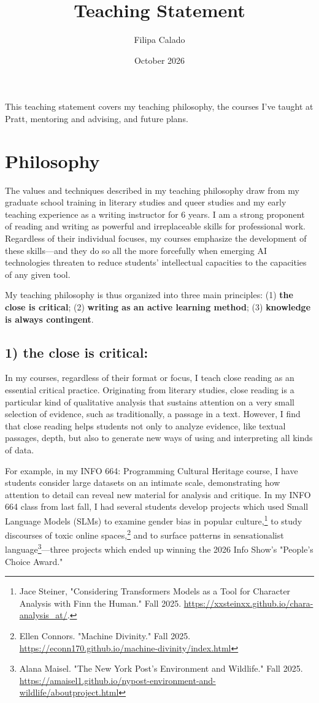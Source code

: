 \documentclass[12pt]{article}
\author{Filipa Calado}
\date{October 2026}
\title{Teaching Statement}
\makeatletter
\renewcommand{\maketitle}{%
\begin{center}
{\LARGE\@title\par}
\vspace{0.5em}
{\large\@author\par}
\vspace{0.5em}
{\large\@date\par}
\end{center}
}
\makeatother
\begin{document}
\maketitle
This teaching statement covers my teaching philosophy, the courses
I've taught at Pratt, mentoring and advising, and future plans.

\section*{Philosophy}
\label{sec:org847a04e}
The values and techniques described in my teaching philosophy draw
from my graduate school training in literary studies and queer studies
and my early teaching experience as a writing instructor for 6 years.
I am a strong proponent of reading and writing as powerful and
irreplaceable skills for professional work. Regardless of their
individual focuses, my courses emphasize the development of these
skills---and they do so all the more forcefully when emerging AI
technologies threaten to reduce students' intellectual capacities to
the capacities of any given tool.

My teaching philosophy is thus organized into three main principles:
(1) \textbf{the close is critical}; (2) \textbf{writing as an active learning
method}; (3) \textbf{knowledge is always contingent}.

\subsection*{1) the close is critical:}
\label{sec:org32f7663}
In my courses, regardless of their format or focus, I teach close
reading as an essential critical practice. Originating from literary
studies, close reading is a particular kind of qualitative analysis
that sustains attention on a very small selection of evidence, such as
traditionally, a passage in a text. However, I find that close reading
helps students not only to analyze evidence, like textual passages,
depth, but also to generate new ways of using and interpreting all
kinds of data.

For example, in my INFO 664: Programming Cultural Heritage course, I
have students consider large datasets on an intimate scale,
demonstrating how attention to detail can reveal new material for
analysis and critique. In my INFO 664 class from last fall, I had
several students develop projects which used Small Language Models
(SLMs) to examine gender bias in popular culture,\footnote{Jace Steiner, "Considering Transformers Models as a Tool for
Character Analysis with Finn the Human." Fall 2025.
\url{https://xxsteinxx.github.io/chara-analysis\_at/}.} to study
discourses of toxic online spaces,\footnote{Ellen Connors. "Machine Divinity." Fall 2025.
\url{https://econn170.github.io/machine-divinity/index.html}} and to surface patterns in
sensationalist language\footnote{Alana Maisel. "The New York Post's Environment and Wildlife."
Fall 2025.
\url{https://amaisel1.github.io/nypost-environment-and-wildlife/aboutproject.html}}---three projects which ended up winning
the 2026 Info Show's "People's Choice Award."
\end{document}
